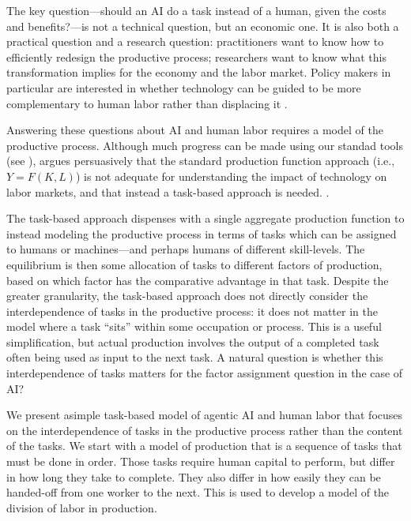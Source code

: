 \documentclass{article}
\theoremstyle{plain}
\theoremstyle{plain}
\begin{document}
The key question---should an AI do a task instead of a human, given the costs and benefits?---is not a technical question, but an economic one.
It is also both a practical question and a research question: practitioners want to know how to efficiently redesign the productive process; researchers want to know what this transformation implies for the economy and the labor market.
Policy makers in particular are interested in whether technology can be guided to be more complementary to human labor rather than displacing it \citep{acemoglu2018automation}.

Answering these questions about AI and human labor requires a model of the productive process.
Although much progress can be made using our standad tools (see \citep{korinek2018artificial}), \cite{acemoglu2024task} argues persuasively that the standard production function approach (i.e., $Y = F(K, L)$) is not adequate for understanding the impact of technology on labor markets, and that instead a task-based approach is needed.
\cite{aghion2024ai}.

The task-based approach dispenses with a single aggregate production function to instead modeling the productive process in terms of tasks which can be assigned to humans or machines---and perhaps humans of different skill-levels.
The equilibrium is then some allocation of tasks to different factors of production, based on which factor has the comparative advantage in that task.
Despite the greater granularity, the task-based approach does not directly consider the interdependence of tasks in the productive process: it does not matter in the model where a task ``sits'' within some occupation or process. 
This is a useful simplification, but actual production involves the output of a completed task often being used as input to the next task.
A natural question is whether this interdependence of tasks matters for the factor assignment question in the case of AI? 

We present asimple task-based model of agentic AI and human labor that focuses on the interdependence of tasks in the productive process rather than the content of the tasks.
We start with a model of production that is a sequence of tasks that must be done in order.
Those tasks require human capital to perform, but differ in how long they take to complete.
They also differ in how easily they can be handed-off from one worker to the next.
This is used to develop a model of the division of labor in production.
\end{document}
